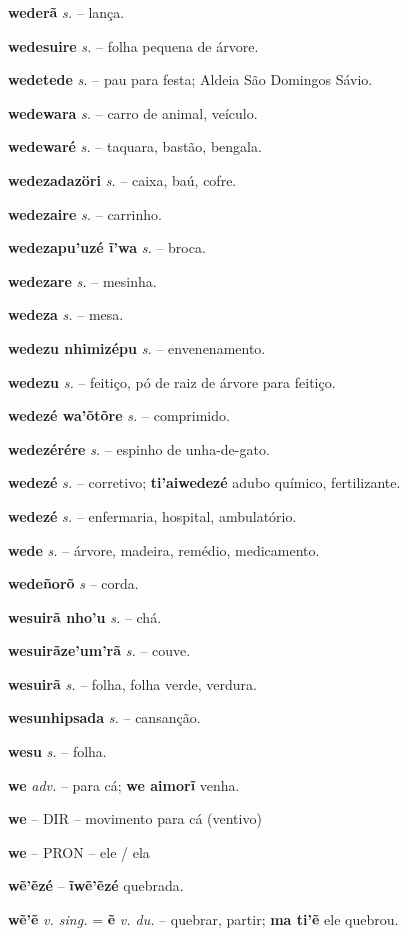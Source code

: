 \textbf{wederã} \textit{s.} -- lança.

\textbf{wedesuire} \textit{s.} -- folha pequena de árvore.

\textbf{wedetede} \textit{s.} -- pau para festa; Aldeia São Domingos Sávio.

\textbf{wedewara} \textit{s.} -- carro de animal, veículo.

\textbf{wedewaré} \textit{s.} -- taquara, bastão, bengala.

\textbf{wedezadazöri} \textit{s.} -- caixa, baú, cofre.

\textbf{wedezaire} \textit{s.} -- carrinho.

\textbf{wedezapu'uzé ĩ'wa} \textit{s.} -- broca.

\textbf{wedezare} \textit{s.} -- mesinha.

\textbf{wedeza} \textit{s.} -- mesa.

\textbf{wedezu nhimizépu} \textit{s.} -- envenenamento.

\textbf{wedezu} \textit{s.} -- feitiço, pó de raiz de árvore para feitiço.

\textbf{wedezé wa'õtõre} \textit{s.} -- comprimido.

\textbf{wedezérére} \textit{s.} -- espinho de unha-de-gato.

\textbf{wedezé} \textit{s.} -- corretivo; \textbf{ti'aiwedezé} adubo químico, fertilizante.

\textbf{wedezé} \textit{s.} -- enfermaria, hospital, ambulatório.

\textbf{wede} \textit{s.} -- árvore, madeira, remédio, medicamento.

\textbf{wedeñorõ} \textit{s} -- corda.

\textbf{wesuirã nho'u} \textit{s.} -- chá.

\textbf{wesuirãze'um'rã} \textit{s.} -- couve.

\textbf{wesuirã} \textit{s.} -- folha, folha verde, verdura.

\textbf{wesunhipsada} \textit{s.} -- cansanção.

\textbf{wesu} \textit{s.} -- folha.

\textbf{we} \textit{adv.} -- para cá; \textbf{we aimorĩ} venha.

\textbf{we} -- {DIR} -- {movimento para cá (ventivo)}

\textbf{we} -- {PRON} -- {ele / ela}

\textbf{wẽ'ẽzé} \textit{} -- \textbf{ĩwẽ'ẽzé} quebrada.

\textbf{wẽ'ẽ} \textit{v. sing.} = \textbf{ẽ} \textit{v. du.} -- quebrar, partir; \textbf{ma ti'ẽ} ele quebrou.

